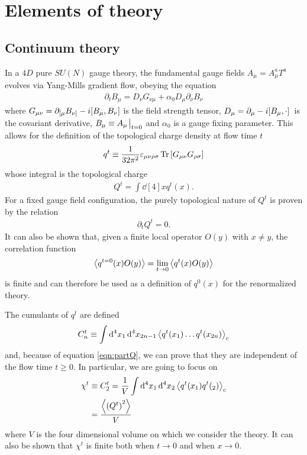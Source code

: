 \section{Elements of theory}%
\label{sec:theory}

\subsection{Continuum theory}%
\label{subsec:continuum}
In a $4D$ pure $SU(N)$ gauge theory, the fundamental gauge fields $A_{\mu} = A_{\mu}^{a}T^{a}$ evolves via Yang-Mills gradient flow, obeying the equation
\begin{align}
  \label{eqn:flowcont}
  \partial_{t}B_{\mu}=D_{\nu}G_{\nu\mu}+\alpha_{0}D_{\mu}\partial_{\nu}B_{\nu}
\end{align}
where $G_{\mu\nu}= \partial_{[\mu}B_{\nu]}-i\commutator{B_{\mu}}{B_{\nu}}$ is the field strength tensor, $D_{\mu} = \partial_{\mu} - i\comm*{B_{\mu}}{\cdot}$ is the covariant derivative, $B_{\mu}\equiv A_{\mu}\eval_{t=0}$ and $\alpha_{0}$ is
a gauge fixing parameter.
This allows for the definition of the topological charge density at flow time $t$
\begin{align}
  q^{t}\equiv \frac{1}{32\pi ^2}\varepsilon_{\mu\nu\rho\sigma}\Tr\qty[G_{\mu\nu}G_{\rho\sigma}]
\end{align}
whose integral is the topological charge
\begin{align}
  Q^{t} = \int \dd[4]{x}q^{t}(x).
\end{align}
For a fixed gauge field configuration, the purely topological nature of $Q^{t}$ is proven by the relation
\begin{align}
  \label{eqn:partQ}
  \partial_{t}Q^{t}=0.
\end{align}
It can also be shown that, given a finite local operator $O(y)$ with $x \neq y$, the correlation function
\begin{align}
  \ev{q^{t=0}(x)O(y)} = \lim_{t\to 0}\ev{q^{t}(x)O(y)}
\end{align}
is finite and can therefore be used as a definition of $q^{0}(x)$ for the renormalized theory.

The cumulants of $q^{t}$ are defined
\begin{align}
  C_{n}^{t}\equiv \int \dd[4]{x_{1}}\dd[4]{x_{2n-1}}\ev{q^{t}(x_{1})\dots q^{t}(x_{2n})}_{c}
\end{align}
and, because of equation \ref{eqn:partQ}, we can prove that they are independent of the flow time $t\ge 0$.
In particular, we are going to focus on
\begin{align}
  \chi^{t} &\equiv C_{2}^{t} = \frac{1}{V}\int \dd[4]{x_{1}}\dd[4]{x_{2}}\ev{q^{t}(x_{1})q^{t}(_{2})}_{c} \notag\\
  &=\frac{\ev{\left(Q^{t}\right)^{2}}}{V}
\end{align}
where $V$ is the four dimensional volume on which we consider the theory.
It can also be shown that $\chi ^{t}$ is finite both when $t\to 0$ and when $x\to 0$.


